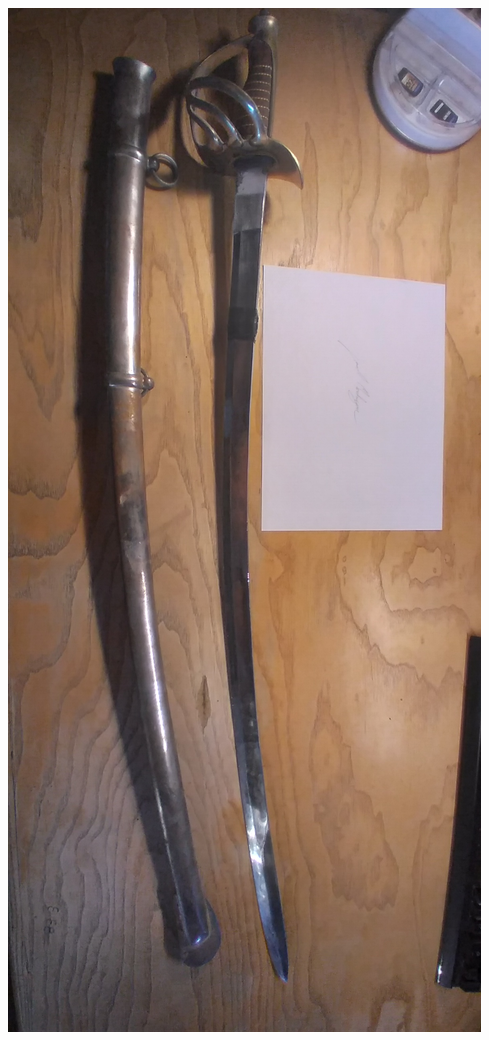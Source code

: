 \documentclass{article}
\begin{document}
\begin{enumerate}
\begin{center}
            \includegraphics[max width=\textwidth - 6ex]{sword}
        \end{center}

\end{enumerate}
\end{document}
